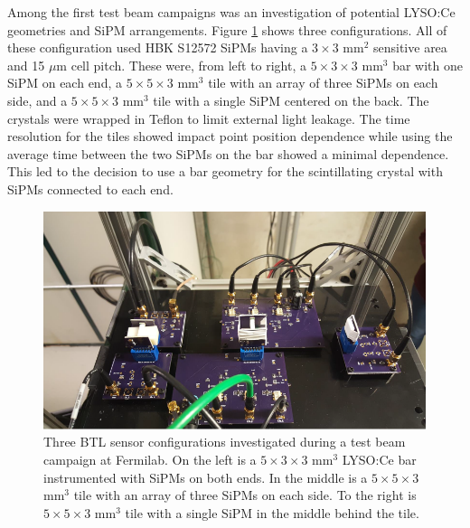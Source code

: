 Among the first test beam campaigns was an investigation of potential LYSO:Ce geometries and SiPM arrangements.  Figure \ref{fig:testbeam1} shows three configurations.  All of these configuration used HBK S12572 SiPMs having a $3 \times 3$ mm$^2$ sensitive area and 15 $\mu$m cell pitch.  These were, from left to right, a $5 \times 3 \times 3$ mm$^3$ bar with one SiPM on each end, a $5 \times 5 \times 3$ mm$^3$ tile with an array of three SiPMs on each side, and a $5 \times 5 \times 3$ mm$^3$ tile with a single SiPM centered on the back.  The crystals were wrapped in Teflon to limit external light leakage.  The time resolution for the tiles showed impact point position dependence while using the average time between the two SiPMs on the bar showed a minimal dependence.  This led to the decision to use a bar geometry for the scintillating crystal with SiPMs connected to each end.
\begin{figure}[h]
	\centering
	\includegraphics[width=0.7\linewidth]{Figures/testbeam1}
	\caption[Test beam setup at Fermilab for investigating different BTL sensor configurations.]{Three BTL sensor configurations investigated during a test beam campaign at Fermilab. On the left is a $5 \times 3\times 3$ mm$^3$ LYSO:Ce bar instrumented with SiPMs on both ends. In the middle is a $5 \times 5 \times 3$ mm$^3$ tile with an array of three SiPMs on each side. To the right is $5 \times 5 \times 3$ mm$^3$ tile with a single SiPM in the middle behind the tile.}
	\label{fig:testbeam1}
\end{figure}


